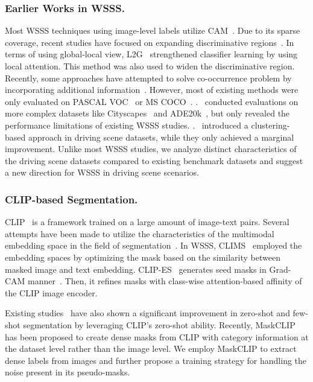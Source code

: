 \documentclass[letterpaper]{article} %
\begin{document}
\subsubsection{Earlier Works in WSSS.} Most WSSS techniques using image-level labels utilize CAM~\cite{zhou2016learning}. Due to its sparse coverage, recent studies have focused on expanding discriminative regions~\cite{jiang2019integral, wei2018revisiting, choe2019attention}. In terms of using global-local view, L2G~\cite{jiang2022l2g} strengthened classifier learning by using local attention. This method was also used to widen the discriminative region. Recently, some approaches have attempted to solve co-occurrence problem by incorporating additional information~\cite{lee2021railroad, lee2022weakly, Xie_2022_CVPR}. However, most of existing methods were only evaluated on PASCAL VOC~\cite{everingham2015pascal} or MS COCO~\cite{lin2014microsoft}. \citeauthor{akiva2023single}.~\citeyear{akiva2023single} conducted evaluations on more complex datasets like Cityscapes~\cite{cordts2016cityscapes} and ADE20k~\cite{zhou2019semantic}, but only revealed the performance limitations of existing WSSS studies. \citeauthor{wang2020deep}.~\citeyear{wang2020deep} introduced a clustering-based approach in driving scene datasets, while they only achieved a marginal improvement. Unlike most WSSS studies, we analyze distinct characteristics of the driving scene datasets compared to existing benchmark datasets and suggest a new direction for WSSS in driving scene scenarios.

\subsubsection{CLIP-based Segmentation.} CLIP~\cite{radford2021learning} is a framework trained on a large amount of image-text pairs. Several attempts have been made to utilize the characteristics of the multimodal embedding space in the field of segmentation~\cite{ding2022decoupling,Wang_2022_CVPR}. In WSSS, CLIMS~\cite{Xie_2022_CVPR} employed the embedding spaces by optimizing the mask based on the similarity between masked image and text embedding. CLIP-ES~\cite{Lin_2023_CVPR} generates seed masks in Grad-CAM manner~\cite{selvaraju2017grad}. Then, it refines masks with class-wise attention-based affinity of the CLIP image encoder.

Existing studies~\cite{li2022languagedriven, xu2021} have also shown a significant improvement in zero-shot and few-shot segmentation by leveraging CLIP's zero-shot ability. Recently, MaskCLIP~\cite{zhou2022extract} has been proposed to create dense masks from CLIP with category information at the dataset level rather than the image level. We employ MaskCLIP to extract dense labels from images and further propose a training strategy for handling the noise present in its pseudo-masks.
\end{document}

